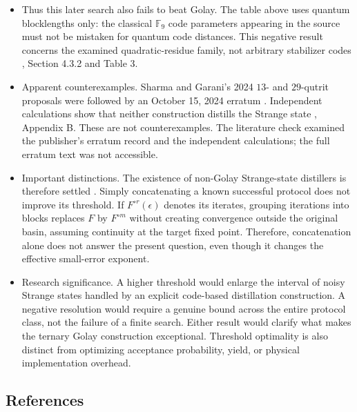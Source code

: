 \begin{itemize}
  \item Thus this later search also fails to beat Golay. The table above uses quantum blocklengths only: the classical $\mathbb F_9$ code parameters appearing in the source must not be mistaken for quantum code distances. This negative result concerns the examined quadratic-residue family, not arbitrary stabilizer codes , Section 4.3.2 and Table 3.

  \item Apparent counterexamples. Sharma and Garani's 2024 $13$- and $29$-qutrit proposals were followed by an October 15, 2024 erratum . Independent calculations show that neither construction distills the Strange state , Appendix B. These are not counterexamples. The literature check examined the publisher's erratum record and the independent calculations; the full erratum text was not accessible.

  \item Important distinctions. The existence of non-Golay Strange-state distillers is therefore settled . Simply concatenating a known successful protocol does not improve its threshold. If $F^{\circ r}(\epsilon)$ denotes its iterates, grouping iterations into blocks replaces $F$ by $F^{\circ m}$ without creating convergence outside the original basin, assuming continuity at the target fixed point. Therefore, concatenation alone does not answer the present question, even though it changes the effective small-error exponent.

  \item Research significance. A higher threshold would enlarge the interval of noisy Strange states handled by an explicit code-based distillation construction. A negative resolution would require a genuine bound across the entire protocol class, not the failure of a finite search. Either result would clarify what makes the ternary Golay construction exceptional. Threshold optimality is also distinct from optimizing acceptance probability, yield, or physical implementation overhead.
\end{itemize}

\subsection*{References}


